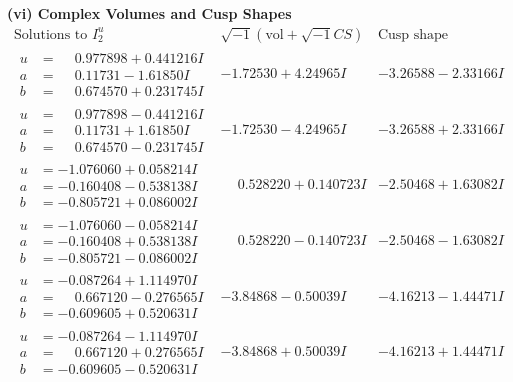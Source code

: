 \documentclass[1p]{elsarticle_modified}
\theoremstyle{definition}
\newcommand{\I}{\sqrt{-1}}
\begin{document}
\newpage\flushleft \textbf{(vi) Complex Volumes and Cusp Shapes}
$$\begin{array}{c|c|c}  
\text{Solutions to }I^u_{2}& \I (\text{vol} + \sqrt{-1}CS) & \text{Cusp shape}\\
 \hline 
\begin{aligned}
u &= \phantom{-}0.977898 + 0.441216 I \\
a &= \phantom{-}0.11731 - 1.61850 I \\
b &= \phantom{-}0.674570 + 0.231745 I\end{aligned}
 & -1.72530 + 4.24965 I & -3.26588 - 2.33166 I \\ \hline\begin{aligned}
u &= \phantom{-}0.977898 - 0.441216 I \\
a &= \phantom{-}0.11731 + 1.61850 I \\
b &= \phantom{-}0.674570 - 0.231745 I\end{aligned}
 & -1.72530 - 4.24965 I & -3.26588 + 2.33166 I \\ \hline\begin{aligned}
u &= -1.076060 + 0.058214 I \\
a &= -0.160408 - 0.538138 I \\
b &= -0.805721 + 0.086002 I\end{aligned}
 & \phantom{-}0.528220 + 0.140723 I & -2.50468 + 1.63082 I \\ \hline\begin{aligned}
u &= -1.076060 - 0.058214 I \\
a &= -0.160408 + 0.538138 I \\
b &= -0.805721 - 0.086002 I\end{aligned}
 & \phantom{-}0.528220 - 0.140723 I & -2.50468 - 1.63082 I \\ \hline\begin{aligned}
u &= -0.087264 + 1.114970 I \\
a &= \phantom{-}0.667120 - 0.276565 I \\
b &= -0.609605 + 0.520631 I\end{aligned}
 & -3.84868 - 0.50039 I & -4.16213 - 1.44471 I \\ \hline\begin{aligned}
u &= -0.087264 - 1.114970 I \\
a &= \phantom{-}0.667120 + 0.276565 I \\
b &= -0.609605 - 0.520631 I\end{aligned}
 & -3.84868 + 0.50039 I & -4.16213 + 1.44471 I \\ \hline\begin{aligned}

\end{aligned}
\end{array}$$
\end{document}
